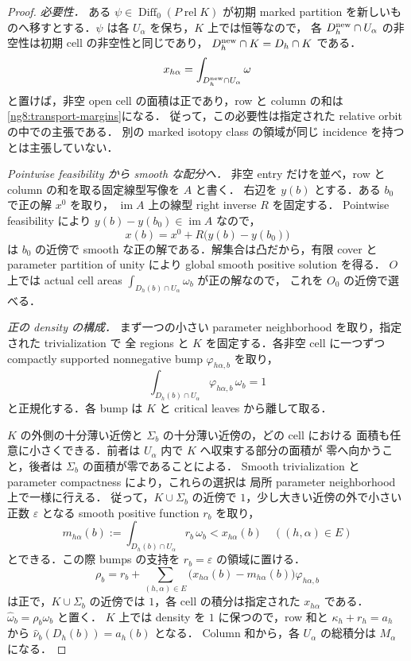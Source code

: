 \begin{proof}
\emph{必要性．}
ある $\psi\in\operatorname{Diff}_0(P\operatorname{ rel}K)$ が初期 marked partition
を新しいものへ移すとする．$\psi$ は各 $U_\alpha$ を保ち，$K$ 上では恒等なので，
各 $D_h^{\rm new}\cap U_\alpha$ の非空性は初期 cell の非空性と同じであり，
$D_h^{\rm new}\cap K=D_h\cap K$ である．
\[
 x_{h\alpha}=\int_{D_h^{\rm new}\cap U_\alpha}\omega
\]
と置けば，非空 open cell の面積は正であり，row と column の和は
\eqref{ng8:transport-margins}になる．
従って，この必要性は指定された relative orbit の中での主張である．
別の marked isotopy class の領域が同じ incidence を持つとは主張していない．

\emph{Pointwise feasibility から smooth な配分へ．}
非空 entry だけを並べ，row と column の和を取る固定線型写像を $A$ と書く．
右辺を $y(b)$ とする．ある $b_0$ で正の解 $x^0$ を取り，
$\operatorname{im}A$ 上の線型 right inverse $R$ を固定する．
Pointwise feasibility により $y(b)-y(b_0)\in\operatorname{im}A$ なので，
\[
 x(b)=x^0+R\bigl(y(b)-y(b_0)\bigr)
\]
は $b_0$ の近傍で smooth な正の解である．解集合は凸だから，有限 cover と
parameter partition of unity により global smooth positive solution を得る．
$O$ 上では actual cell areas $\int_{D_h(b)\cap U_\alpha}\omega_b$ が正の解なので，
これを $O_0$ の近傍で選べる．

\emph{正の density の構成．}
まず一つの小さい parameter neighborhood を取り，指定された trivialization で
全 regions と $K$ を固定する．各非空 cell に一つずつ compactly supported
nonnegative bump $\varphi_{h\alpha,b}$ を取り，
\[
 \int_{D_h(b)\cap U_\alpha}\varphi_{h\alpha,b}\,\omega_b=1
\]
と正規化する．各 bump は $K$ と critical leaves から離して取る．

$K$ の外側の十分薄い近傍と $\Sigma_b$ の十分薄い近傍の，どの cell における
面積も任意に小さくできる．前者は $U_\alpha$ 内で $K$ へ収束する部分の面積が
零へ向かうこと，後者は $\Sigma_b$ の面積が零であることによる．
Smooth trivialization と parameter compactness により，これらの選択は
局所 parameter neighborhood 上で一様に行える．
従って，$K\cup\Sigma_b$ の近傍で $1$，少し大きい近傍の外で小さい正数
$\varepsilon$ となる smooth positive function $r_b$ を取り，
\[
 m_{h\alpha}(b):=
 \int_{D_h(b)\cap U_\alpha}r_b\,\omega_b
 <x_{h\alpha}(b)
 \quad ((h,\alpha)\in E)
\]
とできる．この際 bumps の支持を $r_b=\varepsilon$ の領域に置ける．
\[
 \rho_b=r_b+
 \sum_{(h,\alpha)\in E}
 \bigl(x_{h\alpha}(b)-m_{h\alpha}(b)\bigr)\varphi_{h\alpha,b}
\]
は正で，$K\cup\Sigma_b$ の近傍では $1$，各 cell の積分は指定された
$x_{h\alpha}$ である．$\widehat\omega_b=\rho_b\omega_b$ と置く．
$K$ 上では density を $1$ に保つので，row 和と
$\kappa_h+r_h=a_h$ から $\widehat\nu_b(D_h(b))=a_h(b)$ となる．
Column 和から，各 $U_\alpha$ の総積分は $M_\alpha$ になる．


\end{proof}
